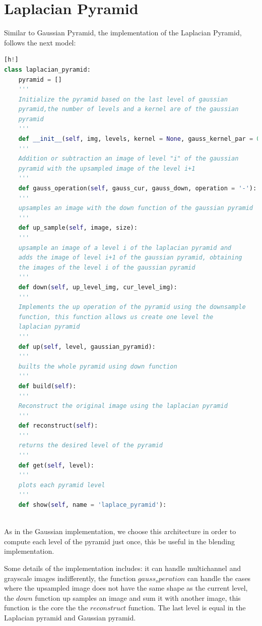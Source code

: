 \section{Laplacian Pyramid}

Similar to Gaussian Pyramid, the implementation of the Laplacian Pyramid, follows the next model:

\begin{lstlisting}[language=python][h!]
class laplacian_pyramid:
    pyramid = []
    '''
    Initialize the pyramid based on the last level of gaussian 
    pyramid,the number of levels and a kernel are of the gaussian
    pyramid
    '''
    def __init__(self, img, levels, kernel = None, gauss_kernel_par = 0.3):  
    '''
    Addition or subtraction an image of level "i" of the gaussian 
    pyramid with the upsampled image of the level i+1 
    '''
    def gauss_operation(self, gauss_cur, gauss_down, operation = '-'):
	'''
    upsamples an image with the down function of the gaussian pyramid
    '''
    def up_sample(self, image, size):
    '''
    upsample an image of a level i of the laplacian pyramid and 
    adds the image of level i+1 of the gaussian pyramid, obtaining 
    the images of the level i of the gaussian pyramid
    '''
    def down(self, up_level_img, cur_level_img):
    '''
    Implements the up operation of the pyramid using the downsample 
    function, this function allows us create one level the 
    laplacian pyramid
    '''
    def up(self, level, gaussian_pyramid):
    '''
    builts the whole pyramid using down function
    '''
    def build(self):  
    '''
    Reconstruct the original image using the laplacian pyramid
    '''
    def reconstruct(self):
    '''
    returns the desired level of the pyramid
    '''
    def get(self, level):
    '''
    plots each pyramid level
    '''
    def show(self, name = 'laplace_pyramid'):
      
\end{lstlisting}

As in the Gaussian implementation, we choose this architecture in order to compute each level of the pyramid just once, this be useful in the blending implementation.

Some details of the implementation includes: it can handle multichannel and grayscale images indifferently, the function  $gauss_operation$ can handle the cases where the upsampled image does not have the same shape as the current level, the $down$ function up samples an image and sum it with another image, this function is the core the the $reconstruct$ function. The last level is equal in the Laplacian pyramid   and Gaussian pyramid.

